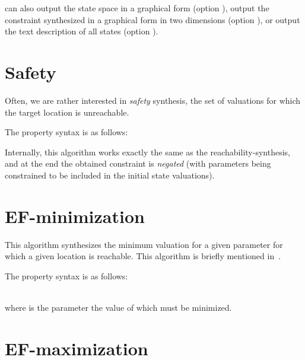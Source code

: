 \imitator{} can also
output the state space in a graphical form (option ),
output the constraint synthesized in a graphical form in two dimensions (option ),
or
output the text description of all states (option ).

\section{Safety}\label{ss:mode:EF}

Often, we are rather interested in \emph{safety} synthesis, \ie{} the set of valuations for which the target location is unreachable.

%

The property syntax is as follows:


Internally, this algorithm works exactly the same as the reachability-synthesis, and at the end the obtained constraint is \emph{negated} (with parameters being constrained to be included in the initial state valuations).


\section{EF-minimization}\label{ss:mode:EFmin}

This algorithm synthesizes the minimum valuation for a given parameter for which a given location is reachable.
This algorithm is briefly mentioned in~\cite{ABPV19}.

The property syntax is as follows:

\\
where  is the parameter the value of which must be minimized.



\section{EF-maximization}\label{ss:mode:EFmax}

